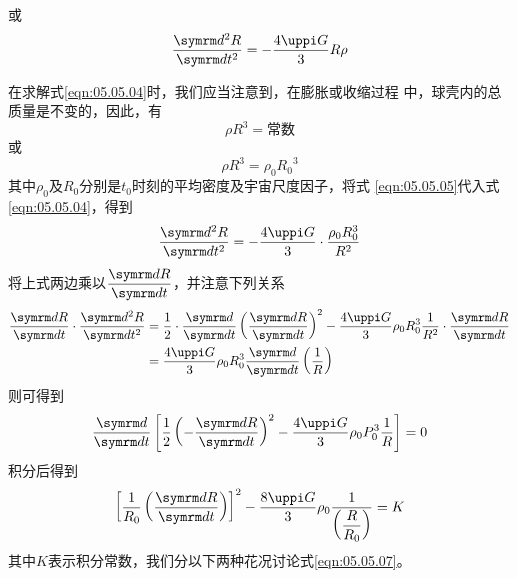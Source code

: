 \clearpage
\noindent 或 \vspace{-1.56em}
\begin{equation}\label{eqn:05.05.04}
  \frac { \dif ^ { 2 } R } { \dif t ^ { 2 } } = - \frac { 4 \uppi G } { 3 } R \rho
\end{equation}

在求解式\eqref{eqn:05.05.04}时，我们应当注意到，在膨胀或收缩过程
中，球壳内的总质量是不变的，因此，有
\begin{equation*}
  \rho R ^ { 3 } = \text{常数}
\end{equation*}
或\vspace{-1.56em}
\begin{equation}\label{eqn:05.05.05}
  \rho R ^ { 3 } = \rho _ 0 { R _ 0} ^ { 3 }
\end{equation}
其中$ \rho _ { 0 } $及$ R _ 0 $分别是$ t _ { 0 } $时刻的平均密度及宇宙尺度因子，将式
\eqref{eqn:05.05.05}代入式\eqref{eqn:05.05.04}，得到
\begin{equation}\label{eqn:05.05.06}
  \frac { \dif ^ { 2 } R } { \dif t ^ { 2 } } = - \frac { 4 \uppi G } { 3 } \cdot \frac { \rho _ { 0 } R _ { 0 } ^ { 3 } } { R ^ { 2 } }
\end{equation}
将上式两边乘以$ \dfrac { \dif R } { \dif t } $，并注意下列关系
\begin{equation*}
  \begin{aligned}
    \frac { \dif R } { \dif t } \cdot \frac { \dif ^ { 2 } R } { \dif t ^ { 2 } }
     & = \frac { 1 } { 2 } \cdot \frac { \dif } { \dif t } \left( \frac { \dif R } { \dif t } \right) ^ { 2 } - \frac { 4 \uppi G } { 3 } \rho _ { 0 } R _ { 0 } ^ { 3 } \frac { 1 } { R ^ { 2 } } \cdot \frac { \dif R } { \dif t } \\
     & = \frac { 4 \uppi G } { 3 } \rho _ { 0 } R _ 0 ^ { 3 } \frac { \dif } { \dif t } \left( \frac { 1 } { R } \right)
  \end{aligned}
\end{equation*}
则可得到\vspace{-0.8em}
\begin{equation*}
  \frac { \dif } { \dif t } \left[ \frac { 1 } { 2 } \left( - \frac { \dif R } { \dif t } \right) ^ { 2 } - \frac { 4 \uppi G } { 3 } \rho _ { 0 } P _ { 0 } ^ { 3 } \frac { 1 } { R } \right] = 0
\end{equation*}
积分后得到\vspace{-0.8em}
\begin{equation}\label{eqn:05.05.07}
  \left[ \frac { 1 } { R _ { 0 } } \left( \frac { \dif R } { \dif t } \right) \right] ^ { 2 } - \frac { 8 \uppi G } { 3 } \rho _ 0 \frac { 1 } {\left( \dfrac { R } { R _ { 0 } }\right)} = K
\end{equation}
其中$ K $表示积分常数，我们分以下两种花况讨论式\eqref{eqn:05.05.07}。

